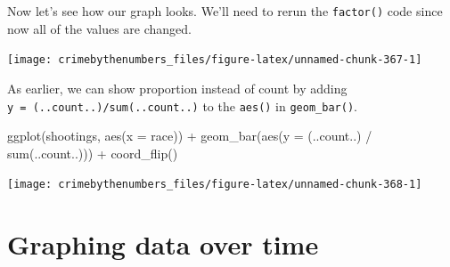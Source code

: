 \documentclass[
]{krantz}
\makeatletter
\newenvironment{Shaded}{\begin{snugshade}}{\end{snugshade}}
\newcommand{\AttributeTok}[1]{\textcolor[rgb]{0.61,0.61,0.61}{#1}}
\newcommand{\ConstantTok}[1]{\textcolor[rgb]{0,0,0}{#1}}
\newcommand{\FunctionTok}[1]{\textcolor[rgb]{0,0,0}{#1}}
\newcommand{\NormalTok}[1]{#1}
\newcommand{\OtherTok}[1]{\textcolor[rgb]{0.37,0.37,0.37}{#1}}
\newcommand{\SpecialCharTok}[1]{\textcolor[rgb]{0,0,0}{#1}}
\newenvironment{kframe}{%
\medskip{}
\setlength{\fboxsep}{.8em}
 \def\at@end@of@kframe{}%
 \ifinner\ifhmode%
  \def\at@end@of@kframe{\end{minipage}}%
  \begin{minipage}{\columnwidth}%
 \fi\fi%
 \def\FrameCommand##1{\hskip\@totalleftmargin \hskip-\fboxsep
 \colorbox{shadecolor}{##1}\hskip-\fboxsep
     \hskip-\linewidth \hskip-\@totalleftmargin \hskip\columnwidth}%
 \MakeFramed {\advance\hsize-\width
   \@totalleftmargin\z@ \linewidth\hsize
   \@setminipage}}%
 {\par\unskip\endMakeFramed%
 \at@end@of@kframe}
\renewenvironment{Shaded}{\begin{kframe}}{\end{kframe}}
\makeatother
\begin{document}
Now let's see how our graph looks. We'll need to rerun the
\texttt{factor()} code since now all of the values are
changed.

\begin{Shaded}
\end{Shaded}

\begin{center}\texttt{[image: crimebythenumbers\_files/figure-latex/unnamed-chunk-367-1]} \end{center}

As earlier, we can show proportion instead of count by
adding \texttt{y\ =\ (..count..)/sum(..count..)} to the
\texttt{aes()} in \texttt{geom\_bar()}.

\begin{Shaded}
\begin{Highlighting}[]
\FunctionTok{ggplot}\NormalTok{(shootings, }\FunctionTok{aes}\NormalTok{(}\AttributeTok{x =}\NormalTok{ race)) }\SpecialCharTok{+}
  \FunctionTok{geom\_bar}\NormalTok{(}\FunctionTok{aes}\NormalTok{(}\AttributeTok{y =}\NormalTok{ (..count..) }\SpecialCharTok{/} \FunctionTok{sum}\NormalTok{(..count..))) }\SpecialCharTok{+}
  \FunctionTok{coord\_flip}\NormalTok{()}
\end{Highlighting}
\end{Shaded}

\begin{center}\texttt{[image: crimebythenumbers\_files/figure-latex/unnamed-chunk-368-1]} \end{center}

\hypertarget{graphing-data-over-time}{%
\section{Graphing data over
time}\label{graphing-data-over-time}}
\end{document}
